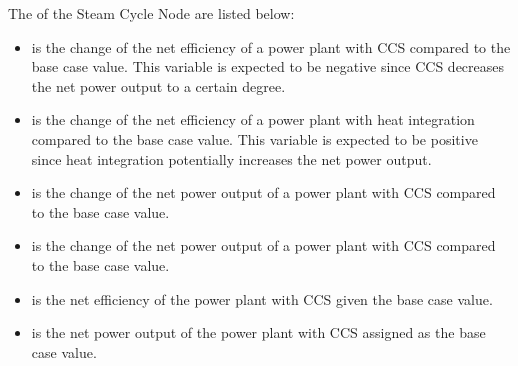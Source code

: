 The  of the Steam Cycle Node are listed below:
\begin{itemize}
	\item {} is the change of the net efficiency of a power plant with CCS compared to the base case value. This variable is expected to be negative since CCS decreases the net power output to a certain degree.
	\item {} is the change of the net efficiency of a power plant with heat integration compared to the base case value. This variable is expected to be positive since heat integration potentially increases the net power output.
	\item {} is the change of the net power output of a power plant with CCS compared to the base case value.
	\item {} is the change of the net power output of a power plant with CCS compared to the base case value.
	\item {} is the net efficiency of the power plant with CCS given the base case value.
	\item {} is the net power output of the power plant with CCS assigned as the base case value.
\end{itemize}

